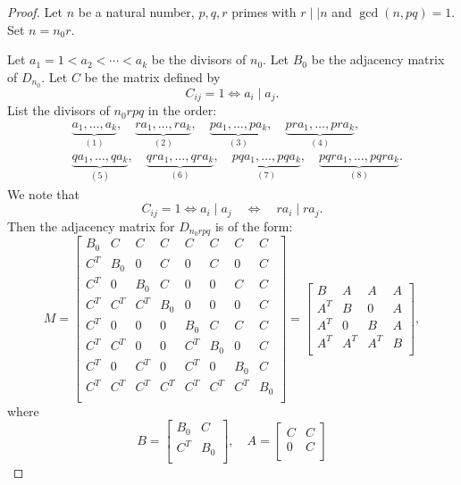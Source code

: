 \documentclass[11pt,a4paper]{amsart}
\theoremstyle{definition}
\numberwithin{equation}{section}
\begin{document}
\begin{proof}
Let $n$ be a natural number, $p,q,r$ primes with $r\mid \mid n$ and $\gcd(n,pq)=1$.  Set $n=n_0r.$

    Let \( a_1 = 1 < a_2 < \cdots < a_k \) be the divisors of \( n_0 \). 
Let \( B_0 \) be the adjacency matrix of \( D_{n_0} \). Let \( C \) be the matrix defined by 
\[
C_{ij} = 1 \iff a_i \mid a_j.\]
List the divisors of \( n_0 r p q \) in the order:
\begin{align*}
&\underbrace{a_1, \ldots, a_k}_{(1)}, \quad 
\underbrace{r a_1, \ldots, r a_k}_{(2)}, \quad 
\underbrace{p a_1, \ldots, p a_k}_{(3)}, \quad 
\underbrace{p r a_1, \ldots, p r a_k}_{(4)}, \\
&\underbrace{q a_1, \ldots, q a_k}_{(5)}, \quad 
\underbrace{q r a_1, \ldots, q r a_k}_{(6)}, \quad 
\underbrace{p q a_1, \ldots, p q a_k}_{(7)}, \quad 
\underbrace{p q r a_1, \ldots, p q r a_k}_{(8)}.
\end{align*}
We note that \[
C_{ij} = 1 \iff a_i \mid a_j \quad \iff \quad r a_i \mid r a_j.
\]
Then the adjacency matrix for \( D_{n_0 r p q} \) is of the form:
\[
M = 
\begin{bmatrix}
B_0 & C & C & C & C & C & C & C \\
C^T & B_0 & 0 & C & 0 & C & 0 & C \\
C^T & 0 & B_0 & C & 0 & 0 & C & C \\
C^T & C^T & C^T & B_0 & 0 & 0 & 0 & C \\
C^T & 0 & 0 & 0 & B_0 & C & C & C \\
C^T & C^T & 0 & 0 & C^T & B_0 & 0 & C \\
C^T & 0 & C^T & 0 & C^T & 0 & B_0 & C \\
C^T & C^T & C^T & C^T & C^T & C^T & C^T & B_0 \\
\end{bmatrix}
= 
\begin{bmatrix}
B & A & A & A \\
A^T & B & 0 & A \\
A^T & 0 & B & A \\
A^T & A^T & A^T & B \\
\end{bmatrix},
\]
where
\[
B = \begin{bmatrix}
B_0 & C \\
C^T & B_0 \\
\end{bmatrix},
\quad
A = \begin{bmatrix}
C & C \\
0 & C \\

\end{bmatrix}\]
\end{proof}
\end{document}
